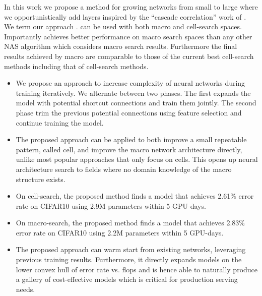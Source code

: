 In this work we propose a method for growing networks from small to large where we opportunistically add layers inspired by the ``cascade correlation'' work of \cite{cascadecorr}. We term our approach \Petridish. \Petridish can be used with both macro and cell-search spaces. Importantly \Petridish achieves better performance on macro search spaces than any other NAS algorithm which considers macro search results. Furthermore the final results achieved by \Petridish macro are comparable to those of the current best cell-search methods including that of \Petridish cell-search methods.

\begin{itemize}
\item We propose an approach to increase complexity of neural networks during training iteratively. We alternate between two phases. The first expands the model with potential shortcut connections and train them jointly. The second phase trim the previous potential connections using feature selection and continue training the model. 
\item The proposed approach can be applied to both improve a small repeatable pattern, called cell, and improve the macro network architecture directly, unlike most popular approaches that only focus on cells. This opens up neural architecture search to fields where no domain knowledge of the macro structure exists. 
\item On cell-search, the proposed method finds a model that achieves 2.61\% error rate on CIFAR10 using 2.9M parameters within 5 GPU-days. 
\item On macro-search, the proposed method finds a model that achieves 2.83\% error rate on CIFAR10 using 2.2M parameters within 5 GPU-days. 
\item The proposed approach can warm start from existing networks, leveraging previous training results. Furthermore, it directly expands models on the lower convex hull of error rate vs. flops and is hence able to naturally produce a gallery of cost-effective models which is critical for production serving needs. 
\end{itemize}


